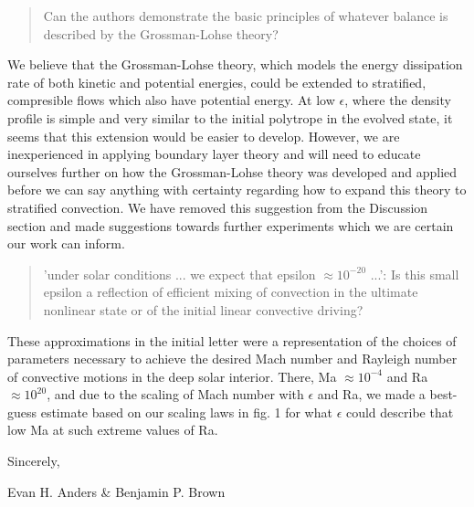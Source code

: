 \documentclass[aps, 11pt, singlecolumn]{revtex4-1} %
\begin{document}
\begin{singlespace}
\begin{quotation}
Can the authors demonstrate the basic principles of whatever balance
is described by the Grossman-Lohse theory?
\end{quotation}
We believe that the Grossman-Lohse theory, which models the energy dissipation rate of both
kinetic and potential energies, could be extended to stratified, compresible flows which also
have potential energy.  At low $\epsilon$, where the density profile is simple and very similar
to the initial polytrope in the evolved state, it seems that this extension would be easier to
develop.  However, we are inexperienced in applying boundary layer theory and 
will need to educate ourselves
further on how the Grossman-Lohse theory was developed and applied before we can say anything
with certainty regarding how to expand this theory to stratified convection. 
We have removed this suggestion from
the Discussion section and made suggestions towards further experiments which we are certain our
work can inform.


\begin{quotation}
'under solar conditions ... we expect that epsilon  $\approx 10^{-20}$
...': Is this small epsilon a reflection of efficient mixing of
convection in the ultimate nonlinear state or of the initial linear
convective driving?
\end{quotation}
These approximations in the initial letter were a representation of the choices of
parameters necessary to achieve the desired Mach number and Rayleigh number of convective
motions in the deep solar interior.  There, Ma $\approx 10^{-4}$ and Ra $\approx 10^{20}$,
and due to the scaling of Mach number with $\epsilon$ and Ra, we made a best-guess estimate
based on our scaling laws in fig. 1 for what $\epsilon$ could describe that low Ma at such
extreme values of Ra.

\end{singlespace}


\noindent
Sincerely,

Evan H. Anders \& Benjamin P. Brown




\end{document}
